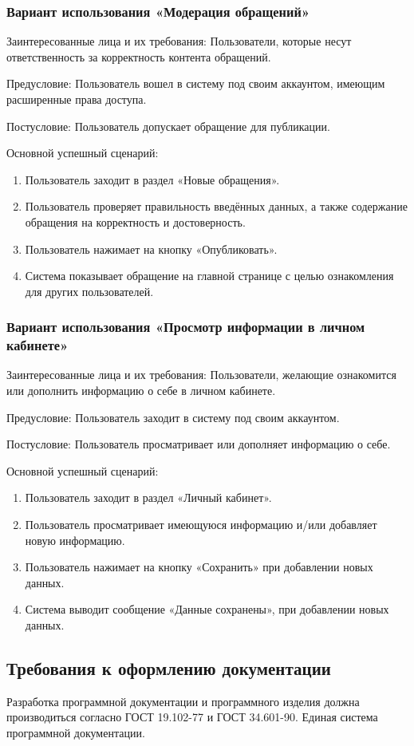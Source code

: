\subsubsection {Вариант использования «Модерация обращений»}

Заинтересованные лица и их требования: Пользователи, которые несут ответственность за корректность контента обращений.

Предусловие: Пользователь вошел в систему под своим аккаунтом, имеющим расширенные права доступа.

Постусловие: Пользователь допускает обращение для публикации.

Основной успешный сценарий: 

\begin{enumerate}
	\item Пользователь заходит в раздел «Новые обращения».
	\item Пользователь проверяет правильность введённых данных, а также содержание обращения на корректность и достоверность.
	\item Пользователь нажимает на кнопку «Опубликовать». 
	\item Система показывает обращение на главной странице с целью ознакомления для других пользователей.
\end{enumerate}

\subsubsection {Вариант использования «Просмотр информации в личном кабинете»}

Заинтересованные лица и их требования: Пользователи, желающие ознакомится или дополнить информацию о себе в личном кабинете.

Предусловие: Пользователь заходит в систему под своим аккаунтом. 

Постусловие: Пользователь просматривает или дополняет информацию о себе.

Основной успешный сценарий: 

\begin{enumerate}
	\item Пользователь заходит в раздел «Личный кабинет».
	\item Пользователь просматривает имеющуюся информацию и/или добавляет новую информацию.
	\item Пользователь нажимает на кнопку «Сохранить» при добавлении новых данных.
	\item Система выводит сообщение «Данные сохранены», при добавлении новых данных.
\end{enumerate}



\subsection{Требования к оформлению документации}

Разработка программной документации и программного изделия должна производиться согласно ГОСТ 19.102-77 и ГОСТ 34.601-90. Единая система программной документации.
